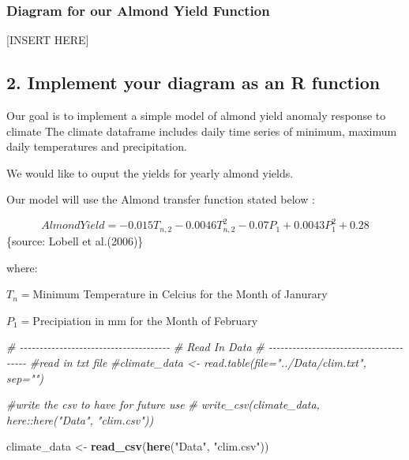 \documentclass[
]{article}
\newenvironment{Shaded}{\begin{snugshade}}{\end{snugshade}}
\newcommand{\CommentTok}[1]{\textcolor[rgb]{0.56,0.35,0.01}{\textit{#1}}}
\newcommand{\FunctionTok}[1]{\textcolor[rgb]{0.13,0.29,0.53}{\textbf{#1}}}
\newcommand{\NormalTok}[1]{#1}
\newcommand{\OtherTok}[1]{\textcolor[rgb]{0.56,0.35,0.01}{#1}}
\newcommand{\StringTok}[1]{\textcolor[rgb]{0.31,0.60,0.02}{#1}}
\begin{document}
\hypertarget{diagram-for-our-almond-yield-function}{%
\subsubsection{Diagram for our Almond Yield
Function}\label{diagram-for-our-almond-yield-function}}

{[}INSERT HERE{]}

\hypertarget{implement-your-diagram-as-an-r-function}{%
\subsection{2. Implement your diagram as an R
function}\label{implement-your-diagram-as-an-r-function}}

Our goal is to implement a simple model of almond yield anomaly response
to climate The climate dataframe includes daily time series of minimum,
maximum daily temperatures and precipitation.

We would like to ouput the yields for yearly almond yields.

Our model will use the Almond transfer function stated below :

\[Almond Yield = -0.015T_{n,2} - 0.0046T^2_{n,2} - 0.07P_1 + 0.0043P^2_1 + 0.28\]
\{source: Lobell et al.(2006)\}

where:

\(T_n =\)Minimum Temperature in Celcius for the Month of Janurary

\(P_1 =\)Precipiation in mm for the Month of February

\begin{Shaded}
\begin{Highlighting}[]
\CommentTok{\# {-}{-}{-}{-}{-}{-}{-}{-}{-}{-}{-}{-}{-}{-}{-}{-}{-}{-}{-}{-}{-}{-}{-}{-}{-}{-}{-}{-}{-}{-}{-}{-}{-}{-}{-}{-}{-}{-}}
\CommentTok{\#               Read In Data}
\CommentTok{\# {-}{-}{-}{-}{-}{-}{-}{-}{-}{-}{-}{-}{-}{-}{-}{-}{-}{-}{-}{-}{-}{-}{-}{-}{-}{-}{-}{-}{-}{-}{-}{-}{-}{-}{-}{-}{-}{-}{-}}
\CommentTok{\#read in txt file}
\CommentTok{\#climate\_data \textless{}{-} read.table(file="../Data/clim.txt", sep="")}

\CommentTok{\#write the csv to have for future use}
\CommentTok{\# write\_csv(climate\_data, here::here("Data", "clim.csv"))}

\NormalTok{climate\_data }\OtherTok{\textless{}{-}} \FunctionTok{read\_csv}\NormalTok{(}\FunctionTok{here}\NormalTok{(}\StringTok{"Data"}\NormalTok{, }\StringTok{"clim.csv"}\NormalTok{))}
\end{Highlighting}
\end{Shaded}
\end{document}
